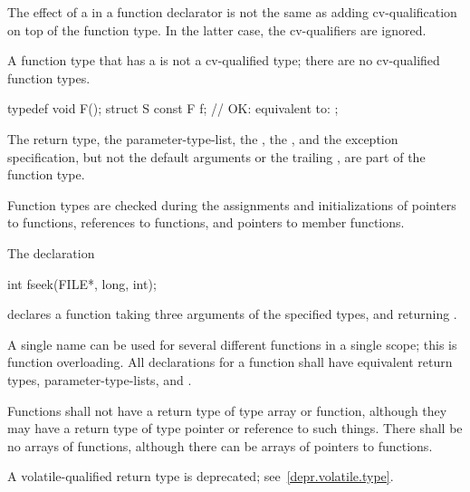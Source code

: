 \pnum
The effect of a
in a function declarator is not the same as
adding cv-qualification on top of the function type.
In the latter case, the cv-qualifiers are ignored.
\begin{note}
A function type that has a  is not a
cv-qualified type; there are no cv-qualified function types.
\end{note}
\begin{example}
\begin{codeblock}
typedef void F();
struct S {
  const F f;        // OK: equivalent to: 
};
\end{codeblock}
\end{example}

\pnum
The return type, the parameter-type-list, the ,
the , and
the exception specification,
but not the default arguments
or the trailing ,
are part of the function type.
\begin{note}
Function types are checked during the assignments and initializations of
pointers to functions, references to functions, and pointers to member functions.
\end{note}

\pnum
\begin{example}
The declaration
\begin{codeblock}
int fseek(FILE*, long, int);
\end{codeblock}
declares a function taking three arguments of the specified types,
and returning
.
\end{example}

\pnum
{}%
A single name can be used for several different functions in a single scope;
this is function overloading.
All declarations for a function shall have equivalent return types,
parameter-type-lists, and .

\pnum
{}%
%
Functions shall not have a return type of type array or function,
although they may have a return type of type pointer or reference to such things.
There shall be no arrays of functions, although there can be arrays of pointers
to functions.

\pnum
A volatile-qualified return type is deprecated;
see~\ref{depr.volatile.type}.

